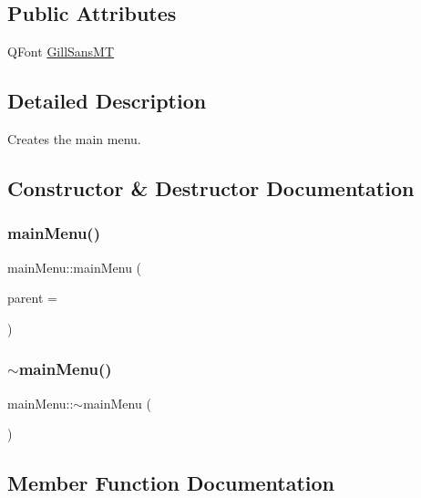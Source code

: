 \subsection*{Public Attributes}
\begin{DoxyCompactItemize}
\item 
Q\+Font \mbox{\hyperlink{classmain_menu_a937fbfebe02bf99da1bc6544b3195472}{Gill\+Sans\+MT}}
\end{DoxyCompactItemize}


\subsection{Detailed Description}
Creates the main menu. 

\subsection{Constructor \& Destructor Documentation}
\mbox{\label{classmain_menu_ad8f61b029e83676e74478cd43ec92119}} 
\subsubsection{\texorpdfstring{mainMenu()}{mainMenu()}}
{\footnotesize\ttfamily main\+Menu\+::main\+Menu (\begin{DoxyParamCaption}\item[{Q\+Widget $\ast$}]{parent = {} }\end{DoxyParamCaption})\hspace{0.3cm}{\ttfamily [explicit]}}

\mbox{\label{classmain_menu_a678e20e05ce6566c1810ef47497d2d50}} 
\subsubsection{\texorpdfstring{$\sim$mainMenu()}{~mainMenu()}}
{\footnotesize\ttfamily main\+Menu\+::$\sim$main\+Menu (\begin{DoxyParamCaption}{ }\end{DoxyParamCaption})}



\subsection{Member Function Documentation}
\mbox{\label{classmain_menu_a7dc76e897fdc12c213b341d434de3e24}} 
